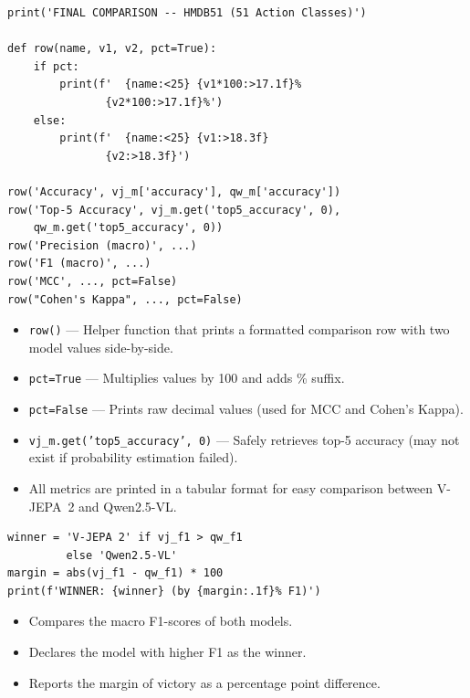 \begin{lstlisting}
print('FINAL COMPARISON -- HMDB51 (51 Action Classes)')

def row(name, v1, v2, pct=True):
    if pct:
        print(f'  {name:<25} {v1*100:>17.1f}%
               {v2*100:>17.1f}%')
    else:
        print(f'  {name:<25} {v1:>18.3f}
               {v2:>18.3f}')

row('Accuracy', vj_m['accuracy'], qw_m['accuracy'])
row('Top-5 Accuracy', vj_m.get('top5_accuracy', 0),
    qw_m.get('top5_accuracy', 0))
row('Precision (macro)', ...)
row('F1 (macro)', ...)
row('MCC', ..., pct=False)
row("Cohen's Kappa", ..., pct=False)
\end{lstlisting}

\begin{explanation}
\begin{itemize}[nosep]
  \item \texttt{row()} --- Helper function that prints a formatted comparison row with two model values side-by-side.
  \item \texttt{pct=True} --- Multiplies values by 100 and adds \% suffix.
  \item \texttt{pct=False} --- Prints raw decimal values (used for MCC and Cohen's Kappa).
  \item \texttt{vj\_m.get('top5\_accuracy', 0)} --- Safely retrieves top-5 accuracy (may not exist if probability estimation failed).
  \item All metrics are printed in a tabular format for easy comparison between V-JEPA~2 and Qwen2.5-VL.
\end{itemize}
\end{explanation}

\begin{lstlisting}
winner = 'V-JEPA 2' if vj_f1 > qw_f1
         else 'Qwen2.5-VL'
margin = abs(vj_f1 - qw_f1) * 100
print(f'WINNER: {winner} (by {margin:.1f}% F1)')
\end{lstlisting}

\begin{explanation}
\begin{itemize}[nosep]
  \item Compares the macro F1-scores of both models.
  \item Declares the model with higher F1 as the winner.
  \item Reports the margin of victory as a percentage point difference.
\end{itemize}
\end{explanation}

